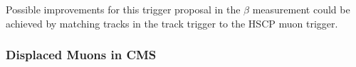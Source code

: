 Possible improvements for this trigger proposal in the $\beta$ measurement could be achieved by matching tracks in the track trigger to the HSCP muon trigger.

\subsubsection{Displaced Muons in CMS}




